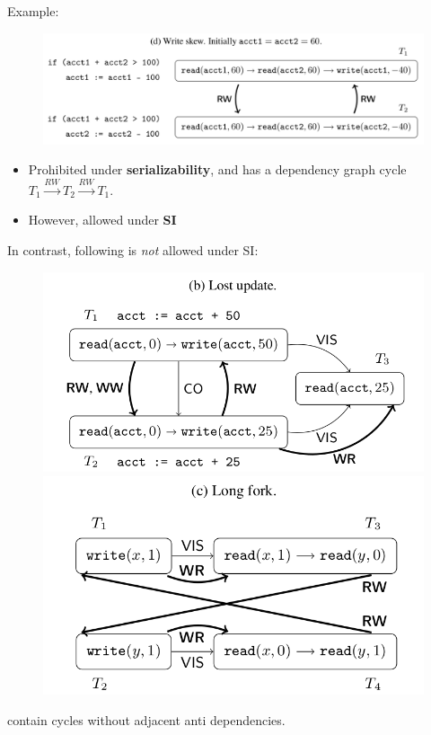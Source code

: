 \documentclass{beamer}
\begin{document}
\begin{frame}
Example:
\begin{figure}
	\includegraphics[scale=0.25]{fig2d}
\end{figure}
\begin{itemize}
	\item Prohibited under \textbf{serializability}, and has a dependency graph cycle $ T_1 \xrightarrow{RW} T_2 \xrightarrow{RW} T_1 $.
	\item However, allowed under \textbf{SI}
\end{itemize}
\end{frame}

\begin{frame}
In contrast, following is \emph{not} allowed under SI:
\begin{figure}
	\includegraphics[scale=0.2]{fig2b}
	\includegraphics[scale=0.2]{fig2c}
\end{figure}
contain cycles without adjacent anti dependencies.
\end{frame}
\end{document}
